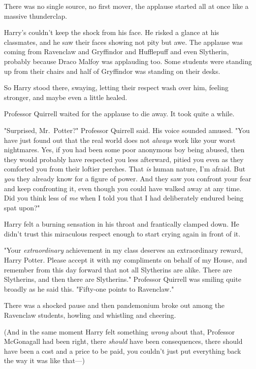 There was no single source, no first mover, the applause started all at once 
like a massive thunderclap.

Harry's couldn't keep the shock from his face. He risked a glance at his 
classmates, and he saw their faces showing not pity but awe. The applause was 
coming from Ravenclaw and Gryffindor and Hufflepuff and even Slytherin, 
probably because Draco Malfoy was applauding too. Some students were standing 
up from their chairs and half of Gryffindor was standing on their desks.

So Harry stood there, swaying, letting their respect wash over him, feeling 
stronger, and maybe even a little healed.

Professor Quirrell waited for the applause to die away. It took quite a while.

"Surprised, Mr.~Potter?" Professor Quirrell said. His voice sounded amused. 
"You have just found out that the real world does not \emph{always} work like 
your worst nightmares. Yes, if you had been some poor anonymous boy being 
abused, then they would probably have respected you less afterward, pitied you 
even as they comforted you from their loftier perches. That \emph{is} human 
nature, I'm afraid. But \emph{you} they already know for a figure of power. And 
they saw you confront your fear and keep confronting it, even though you could 
have walked away at any time. Did you think less of \emph{me} when I told you 
that I had deliberately endured being spat upon?"

Harry felt a burning sensation in his throat and frantically clamped down. He 
didn't trust this miraculous respect enough to start crying again in front of 
it.

"Your \emph{extraordinary} achievement in my class deserves an extraordinary 
reward, Harry Potter. Please accept it with my compliments on behalf of my 
House, and remember from this day forward that not all Slytherins are alike. 
There are Slytherins, and then there are Slytherins." Professor Quirrell was 
smiling quite broadly as he said this. "Fifty-one points to Ravenclaw."

There was a shocked pause and then pandemonium broke out among the Ravenclaw 
students, howling and whistling and cheering.

(And in the same moment Harry felt something \emph{wrong} about that, Professor 
McGonagall had been right, there \emph{should} have been consequences, there 
should have been a cost and a price to be paid, you couldn't just put 
everything back the way it was like that---)

